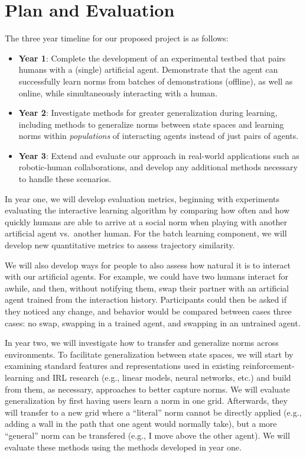 
\section{Plan and Evaluation}
The three year timeline for our proposed project is as follows:

\begin{itemize}
\item {\bf Year 1}: Complete the development of an experimental
  testbed that pairs humans with a (single) artificial agent.
  Demonstrate that the agent can successfully learn norms from batches
  of demonstrations (offline), as well as online, while simultaneously
  interacting with a human.

\item {\bf Year 2}: Investigate methods for greater generalization
  during learning, including methods to generalize norms between state
  spaces and learning norms within {\em populations\/} of interacting
  agents instead of just pairs of agents.

\item {\bf Year 3}: Extend and evaluate our approach in real-world
  applications such as robotic-human collaborations, and develop any
  additional methods necessary to handle these scenarios.
\end{itemize}

In year one, we will develop evaluation metrics, beginning with
experiments evaluating the interactive learning algorithm by comparing
how often and how quickly humans are able to arrive at a social norm
when playing with another artificial agent vs.\ another human.  For
the batch learning component, we will develop new quantitative metrics
to assess trajectory similarity.

We will also develop ways for people to also assess how natural it is
to interact with our artificial agents. For example, we could have two
humans interact for awhile, and then, without notifying them, swap
their partner with an artificial agent trained from the interaction
history. Participants could then be asked if they noticed any change,
and behavior would be compared between cases three cases: no swap,
swapping in a trained agent, and swapping in an untrained agent.

In year two, we will investigate how to transfer and generalize norms
across environments. To facilitate generalization between state
spaces, we will start by examining standard features and
representations used in existing reinforcement-learning 
and IRL research (e.g., linear models, neural networks, etc.) and
build from them, as necessary, approaches to better capture norms. We
will evaluate generalization by first having users learn a norm in one
grid. Afterwards, they will transfer to a new grid where a ``literal''
norm cannot be directly applied (e.g., adding a wall in the path that
one agent would normally take), but a more ``general'' norm can be
transfered (e.g., I move above the other agent). We will evaluate
these methods using the methods developed in year one.

